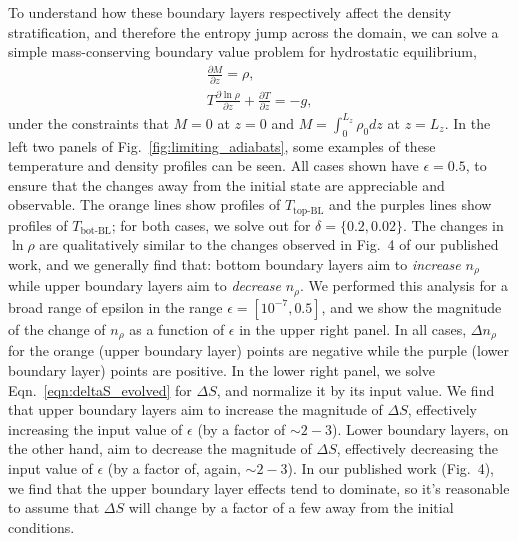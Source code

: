 \documentclass[aps, pre, onecolumn, nofootinbib, notitlepage, groupedaddress, amsfonts, amssymb, amsmath, longbibliography, superscriptaddress]{revtex4-1}
\begin{document}
To understand how these boundary layers respectively affect the density stratification, and therefore the entropy jump across the domain, we can solve a simple mass-conserving boundary value problem for hydrostatic equilibrium, 
\begin{equation}
\begin{split}
\frac{\partial M}{\partial z} = \rho,\\
T\frac{\partial \ln\rho}{\partial z} + \frac{\partial T}{\partial z} = -g,
\end{split}
\end{equation}
under the constraints that $M = 0$ at $z = 0$ and $M = \int_0^{L_z} \rho_0 dz$ at $z = L_z$.
In the left two panels of Fig.~\ref{fig:limiting_adiabats}, some examples of these temperature and density profiles can be seen.
All cases shown have $\epsilon = 0.5$, to ensure that the changes away from the initial state are appreciable and observable.
The orange lines show profiles of $T_{\text{top-BL}}$ and the purples lines show profiles of $T_{\text{bot-BL}}$; for both cases, we solve out for $\delta = \{0.2, 0.02\}$.
The changes in $\ln\rho$ are qualitatively similar to the changes observed in Fig.~4 of our published work, and we generally find that: bottom boundary layers aim to \emph{increase} $n_\rho$ while upper boundary layers aim to \emph{decrease} $n_\rho$.
We performed this analysis for a broad range of epsilon in the range $\epsilon = [10^{-7}, 0.5]$, and we show the magnitude of the change of $n_\rho$ as a function of $\epsilon$ in the upper right panel.
In all cases, $\Delta n_\rho$ for the orange (upper boundary layer) points are negative while the purple (lower boundary layer) points are positive.
In the lower right panel, we solve Eqn.~\ref{eqn:deltaS_evolved} for $\Delta S$, and normalize it by its input value.
We find that upper boundary layers aim to increase the magnitude of $\Delta S$, effectively increasing the input value of $\epsilon$ (by a factor of $\sim 2-3$).
Lower boundary layers, on the other hand, aim to decrease the magnitude of $\Delta S$, effectively decreasing the input value of $\epsilon$ (by a factor of, again, $\sim 2-3$).
In our published work (Fig.~4), we find that the upper boundary layer effects tend to dominate, so it's reasonable to assume that $\Delta S$ will change by a factor of a few away from the initial conditions.
\end{document}

